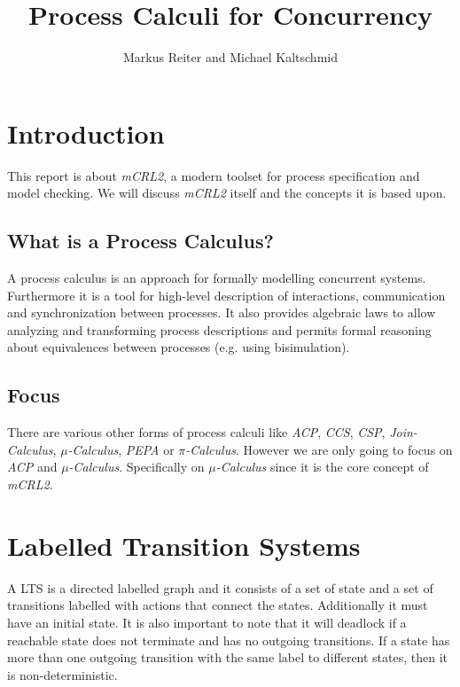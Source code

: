 \documentclass{clseminar}
\title{Process Calculi for Concurrency}
\author{Markus Reiter and Michael Kaltschmid}
\begin{document}
  \maketitle
  \newpage
  \tableofcontents

  \section{Introduction}
  This report is about \textit{mCRL2}, a modern toolset for process specification and model checking. We will discuss \textit{mCRL2} itself and the concepts it is based upon.

  \subsection{What is a Process Calculus?}

  A process calculus is an approach for formally modelling concurrent systems. Furthermore it is a tool for high-level description of interactions, communication and synchronization between processes. It also provides algebraic laws to allow analyzing and transforming process descriptions and permits formal reasoning about equivalences between processes (e.g. using bisimulation). \cite{process_calculus_wiki}

  \subsection{Focus}

  There are various other forms of process calculi like \textit{ACP}, \textit{CCS}, \textit{CSP}, \textit{Join-Calculus}, \textit{$\mu$-Calculus}, \textit{PEPA} or \textit{$\pi$-Calculus}. However we are only going to focus on \textit{ACP} and \textit{$\mu$-Calculus}. Specifically on \textit{$\mu$-Calculus} since it is the core concept of \textit{mCRL2}.

  \section{Labelled Transition Systems}

  A LTS is a directed labelled graph and it consists of a set of state and a set of transitions labelled with actions that connect the states. Additionally it must have an initial state. It is also important to note that it will deadlock if a reachable state does not terminate and has no outgoing
  transitions. If a state has more than one outgoing transition with the same label to different states, then it is non-deterministic.
\end{document}
